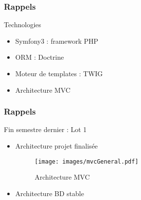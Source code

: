 \speaker{\Francois}

\begin{frame}
\frametitle{Rappels}
\begin{block}{Technologies}
	\begin{itemize}
		\item Symfony3 : framework PHP
		\item ORM : Doctrine
		\item Moteur de templates : TWIG
		\item Architecture MVC
	\end{itemize}
\end{block}
\end{frame}

\begin{frame}
\frametitle{Rappels}
\begin{block}{Fin semestre dernier : Lot 1}
	\begin{itemize}
		\item Architecture projet finalisée
		\begin{figure}[!h]
			\begin{center}
				\texttt{[image: images/mvcGeneral.pdf]}
				\caption{Architecture MVC}
			\end{center}
		\end{figure}
		\item Architecture BD stable
	\end{itemize}
\end{block}
\end{frame}